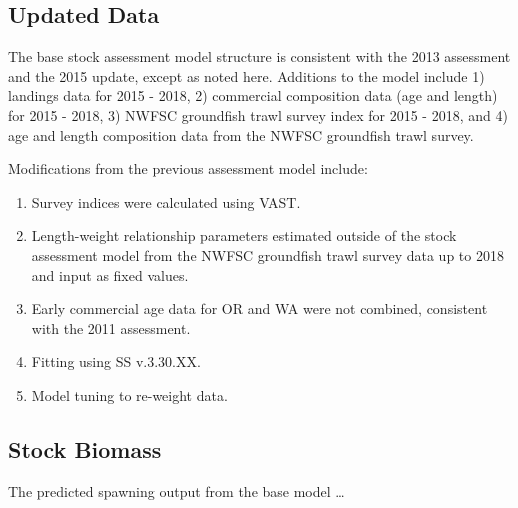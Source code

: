\documentclass[12pt,]{article}
\begin{document}
\subsection*{Updated Data}\label{updated-data}

The base stock assessment model structure is consistent with the 2013
assessment and the 2015 update, except as noted here. Additions to the
model include 1) landings data for 2015 - 2018, 2) commercial
composition data (age and length) for 2015 - 2018, 3) NWFSC groundfish
trawl survey index for 2015 - 2018, and 4) age and length composition
data from the NWFSC groundfish trawl survey.

Modifications from the previous assessment model include:

\begin{enumerate}

\item Survey indices were calculated using VAST.

\item Length-weight relationship parameters estimated outside of the stock assessment model from the NWFSC groundfish trawl survey data up to 2018 and input as fixed values.

\item Early commercial age data for OR and WA were not combined, consistent with the 2011 assessment.

\item Fitting using SS v.3.30.XX. 

\item Model tuning to re-weight data. 

\end{enumerate}

\subsection*{Stock Biomass}\label{stock-biomass}

The predicted spawning output from the base model \ldots{}
\end{document}
